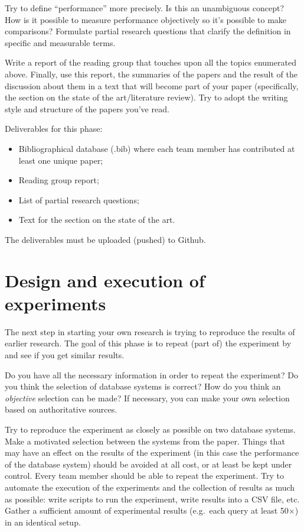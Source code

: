 \documentclass[fleqn,10pt]{artikeltin}
\begin{document}
Try to define ``performance'' more precisely. Is this an unambiguous concept? How is it possible to measure performance objectively so it's possible to make comparisons? Formulate partial research questions that clarify the definition in specific and measurable terms.

Write a report of the reading group that touches upon all the topics enumerated above. Finally, use this report, the summaries of the papers and the result of the discussion about them in a text that will become part of your paper (specifically, the section on the state of the art/literature review). Try to adopt the writing style and structure of the papers you've read.

Deliverables for this phase:

\begin{itemize}
	\item Bibliographical database (.bib) where each team member has contributed at least one unique paper;
	\item Reading group report;
	\item List of partial research questions;
	\item Text for the section on the state of the art.
\end{itemize}
The deliverables must be uploaded (pushed) to Github.

\section{Design and execution of experiments}
\label{sec:experiments}

The next step in starting your own research is trying to reproduce the results of earlier research. The goal of this phase is to repeat (part of) the experiment by~\textcite{Bassil2012} and see if you get similar results.

Do you have all the necessary information in order to repeat the experiment? Do you think the selection of database systems is correct? How do you think an \emph{objective} selection can be made? If necessary, you can make your own selection based on authoritative sources.

Try to reproduce the experiment as closely as possible on two database systems. Make a motivated selection between the systems from the paper. Things that may have an effect on the results of the experiment (in this case the performance of the database system) should be avoided at all cost, or at least be kept under control. Every team member should be able to repeat the experiment. Try to automate the execution of the experiments and the collection of results as much as possible: write scripts to run the experiment, write results into a CSV file, etc. Gather a sufficient amount of experimental results (e.g.~each query at least 50$\times$) in an identical setup.
\end{document}
